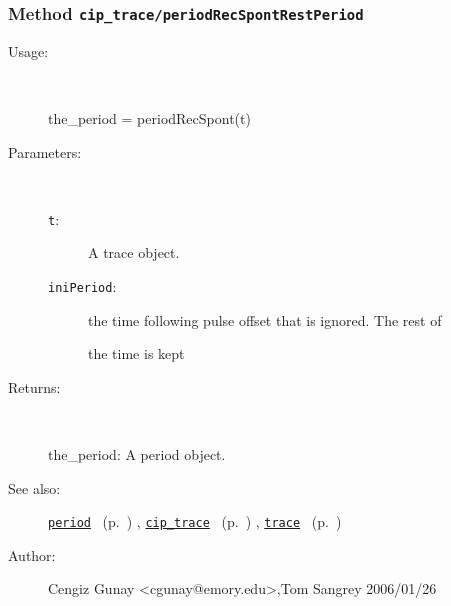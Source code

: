 \subsubsection[Method \texttt{periodRecSpontRestPeriod}]{Method \texttt{cip\_trace/periodRecSpontRestPeriod}}%
%
\label{ref_cip_trace__periodRecSpontRestPeriod}%
\hypertarget{ref_cip_trace__periodRecSpontRestPeriod}{}%
\begin{description}
%
\item[Usage:]~%
\begin{lyxcode}%
the\_period = periodRecSpont(t)
%
\end{lyxcode}%
%
%
\item[Parameters:]~
\begin{description}%
\item[\texttt{t}:]
 A trace object.
\item[\texttt{iniPeriod}:]
 the time following pulse offset that is ignored. The rest of

the time is kept
\end{description}%
%
\item[Returns:
]~

	the\_period: A period object.
%
%
\item[See also:]%
\hyperlink{ref_period}{\texttt{period}}%
\ (p.~\pageref{ref_period})%
%
, \hyperlink{ref_cip_trace}{\texttt{cip\_trace}}%
\ (p.~\pageref{ref_cip_trace})%
%
, \hyperlink{ref_trace}{\texttt{trace}}%
\ (p.~\pageref{ref_trace})%
%
%
\item[Author:]%
Cengiz Gunay <cgunay@emory.edu>,Tom Sangrey 2006/01/26
%
\end{description}
\methodline%
